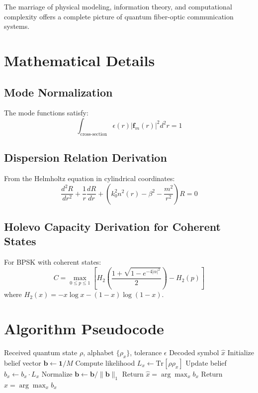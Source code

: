 \documentclass[12pt,a4paper]{article}
\begin{document}
The marriage of physical modeling, information theory, and computational complexity offers a complete picture of quantum fiber-optic communication systems.

\appendix
\section{Mathematical Details}

\subsection{Mode Normalization}

The mode functions satisfy:
\begin{equation}
\int_{\text{cross-section}} \epsilon(r)|\mathbf{f}_m(r)|^2 d^2r = 1
\end{equation}

\subsection{Dispersion Relation Derivation}

From the Helmholtz equation in cylindrical coordinates:
\begin{equation}
\frac{d^2R}{dr^2} + \frac{1}{r}\frac{dR}{dr} + \left(k_0^2n^2(r) - \beta^2 - \frac{m^2}{r^2}\right)R = 0
\end{equation}

\subsection{Holevo Capacity Derivation for Coherent States}

For BPSK with coherent states:
\begin{equation}
C = \max_{0 \leq p \leq 1} \left[ H_2\left(\frac{1 + \sqrt{1 - e^{-4|\alpha|^2}}}{2}\right) - H_2(p) \right]
\end{equation}
where $H_2(x) = -x\log x - (1-x)\log(1-x)$.

\section{Algorithm Pseudocode}

\begin{algorithm}
\caption{Approximate Quantum Decoding Algorithm}
\begin{algorithmic}[1]
\Require Received quantum state $\rho$, alphabet $\{\rho_x\}$, tolerance $\epsilon$
\Ensure Decoded symbol $\hat{x}$
\State Initialize belief vector $\mathbf{b} \leftarrow \mathbf{1}/M$
        \State Compute likelihood $L_x \leftarrow \text{Tr}[\rho \rho_x]$
        \State Update belief $b_x \leftarrow b_x \cdot L_x$
    \EndFor
    \State Normalize $\mathbf{b} \leftarrow \mathbf{b}/\|\mathbf{b}\|_1$
        \State Return $\hat{x} = \arg\max_x b_x$
    \EndIf
\EndFor
\State Return $\hat{x} = \arg\max_x b_x$
\end{algorithmic}
\end{algorithm}
\end{document}
